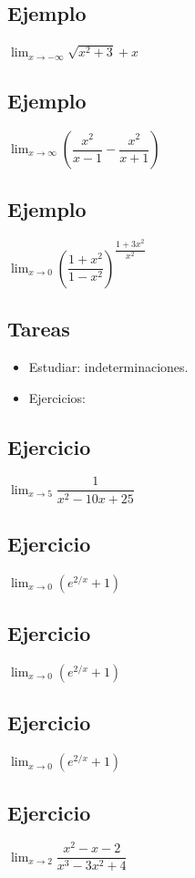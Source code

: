 \documentclass[10pt, a4paper]{article}
\begin{document}
\subsection{Ejemplo}
\label{sec:orgdc5338a}
\(\displaystyle\lim_{ {x} \rightarrow {-\infty} } {\sqrt{x^2+3}+x}\)
\subsection{Ejemplo}
\label{sec:org731d019}
\(\displaystyle\lim_{ {x} \rightarrow {\infty} } {\left( \dfrac{x^2}{x-1} - \dfrac{x^2}{x+1} \right)}\)
\subsection{Ejemplo}
\label{sec:org5b56f2c}
\(\displaystyle\lim_{ {x} \rightarrow {0} } {\left(\dfrac{1+x^2}{1-x^2}\right)^{\dfrac{1+3x^2}{x^2}}}\)
\subsection*{Tareas}
\label{sec:org7f82a6d}
\begin{itemize}
\item Estudiar: indeterminaciones.
\item Ejercicios:
\end{itemize}
\subsection{Ejercicio}
\label{sec:org04d15de}
\(\displaystyle\lim_{ {x} \rightarrow {5} } {\dfrac{1}{x^2-10x+25}}\)
\subsection{Ejercicio}
\label{sec:orgfc2b89c}
\(\displaystyle\lim_{ {x} \rightarrow {0} } {\left(e^{2/x}+1\right)}\)
\subsection{Ejercicio}
\label{sec:orgdd289e3}
\(\displaystyle\lim_{ {x} \rightarrow {0} } {\left(e^{2/x}+1\right)}\)
\subsection{Ejercicio}
\label{sec:org7f0bd40}
\(\displaystyle\lim_{ {x} \rightarrow {0} } {\left(e^{2/x}+1\right)}\)
\subsection{Ejercicio}
\label{sec:orge4249ef}
\(\displaystyle\lim_{ {x} \rightarrow {2} } {\dfrac{x^2-x-2}{x^3-3x^2+4}}\)
\end{document}
